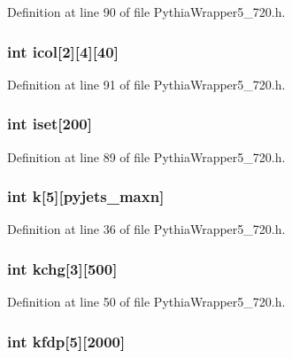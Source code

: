 Definition at line 90 of file Pythia\-Wrapper5\_\-720.h.
\subsubsection{\setlength{\rightskip}{0pt plus 5cm}int {\bf icol}[2][4][40]}\label{PythiaWrapper5__720_8h_480809e7cedee395e1215a812b1d1003}




Definition at line 91 of file Pythia\-Wrapper5\_\-720.h.
\subsubsection{\setlength{\rightskip}{0pt plus 5cm}int {\bf iset}[200]}\label{PythiaWrapper5__720_8h_73e9dec33fbb4245a83b6de0e4120790}




Definition at line 89 of file Pythia\-Wrapper5\_\-720.h.
\subsubsection{\setlength{\rightskip}{0pt plus 5cm}int {\bf k}[5][{\bf pyjets\_\-maxn}]}\label{PythiaWrapper5__720_8h_93d2c477252003afeb74ae6ca06fc2ec}




Definition at line 36 of file Pythia\-Wrapper5\_\-720.h.
\subsubsection{\setlength{\rightskip}{0pt plus 5cm}int {\bf kchg}[3][500]}\label{PythiaWrapper5__720_8h_6ccf6a47da3afabc9fa922d8b3dfb61d}




Definition at line 50 of file Pythia\-Wrapper5\_\-720.h.
\subsubsection{\setlength{\rightskip}{0pt plus 5cm}int {\bf kfdp}[5][2000]}\label{PythiaWrapper5__720_8h_011b026bbe10689b290374573fd31e14}




